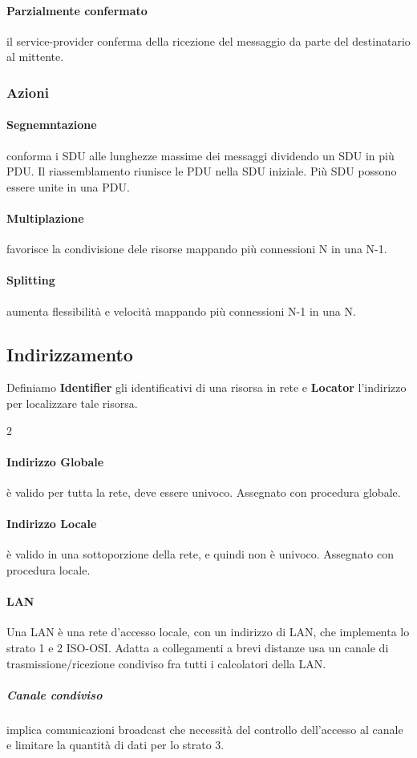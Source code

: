 \paragraph{Parzialmente confermato} il service-provider conferma della ricezione del messaggio da parte del destinatario al mittente.
\subsubsection{Azioni}
\paragraph{Segnemntazione} conforma i SDU alle lunghezze massime dei messaggi dividendo un SDU in più PDU. Il riassemblamento riunisce le PDU nella SDU iniziale.
Più SDU possono essere unite in una PDU.
\paragraph{Multiplazione} favorisce la condivisione dele risorse mappando più connessioni N in una N-1.
\paragraph{Splitting} aumenta flessibilità e velocità mappando più connessioni N-1 in una N.
\subsection{Indirizzamento}
Definiamo \textbf{Identifier} gli identificativi di una risorsa in rete e \textbf{Locator} l'indirizzo per localizzare tale risorsa.
\begin{paracol}{2}
	\paragraph{Indirizzo Globale} è valido per tutta la rete, deve essere univoco. Assegnato con procedura globale.
	\switchcolumn
	\paragraph{Indirizzo Locale} è valido in una sottoporzione della rete, e quindi non è univoco. Assegnato con procedura locale.
\end{paracol}
\paragraph{LAN}
Una LAN è una rete d'accesso locale, con un indirizzo di LAN, che implementa lo strato 1 e 2 ISO-OSI. Adatta a collegamenti a brevi distanze usa un canale di trasmissione/ricezione condiviso fra tutti i calcolatori della LAN.
\subparagraph{Canale condiviso} implica comunicazioni broadcast che necessità del controllo dell'accesso al canale e limitare la quantità di dati per lo strato 3.
